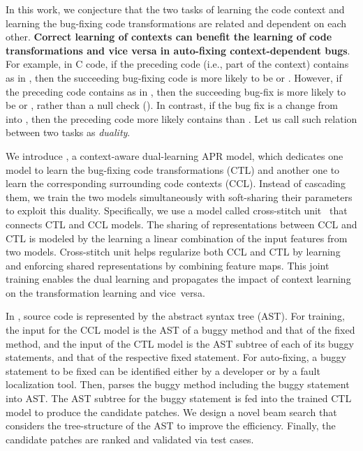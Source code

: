 In this work, we conjecture that the two tasks of learning the code
context and learning the bug-fixing code transformations are related
and dependent on each other. {\bf Correct learning of contexts can
  benefit the learning of code transformations and vice versa in
  auto-fixing context-dependent bugs}. For example, in C code, if the
preceding code (i.e., part of the context) contains  as in
, then the succeeding
bug-fixing code is more likely to be  or
. However, if the preceding code contains
 as in , then the
succeeding bug-fix is more likely to be  or
, rather than a null check (). In contrast, if the bug fix is a
change from  into , then the
preceding code more likely contains  than .
Let us call such relation between two tasks as {\em duality}.

We introduce {\tool}, a context-aware dual-learning APR model, which
dedicates one model to learn the bug-fixing code transformations
(CTL) and another one to learn the corresponding surrounding code
contexts (CCL). Instead of cascading them, we train the two models
simultaneously with soft-sharing their parameters to exploit this
duality. Specifically, we use a model called cross-stitch
unit~\cite{misra2016cross} that connects CTL and CCL models. The
sharing of representations between CCL and CTL is modeled by the
learning a linear combination of the input features from two models.
Cross-stitch unit helps regularize both CCL and CTL by learning and
enforcing shared representations by combining feature maps. This joint
training enables the dual learning and propagates the impact of
context learning on the transformation learning and vice~versa.

In {\tool}, source code is represented by the abstract syntax tree
(AST). For training, the input for the CCL model is the AST of a buggy
method and that of the fixed method, and the input of the CTL model is
the AST subtree of each of its buggy statements, and that of the
respective fixed statement. For auto-fixing, a buggy statement to be
fixed can be identified either by a developer or by a fault
localization tool.  Then, {\tool} parses the buggy method including
the buggy statement into AST. The AST subtree for the buggy statement
is fed into the trained CTL model to produce the candidate patches. We
design a novel beam search that considers the tree-structure of the
AST to improve the efficiency. Finally, the candidate patches are
ranked and validated via test cases.


